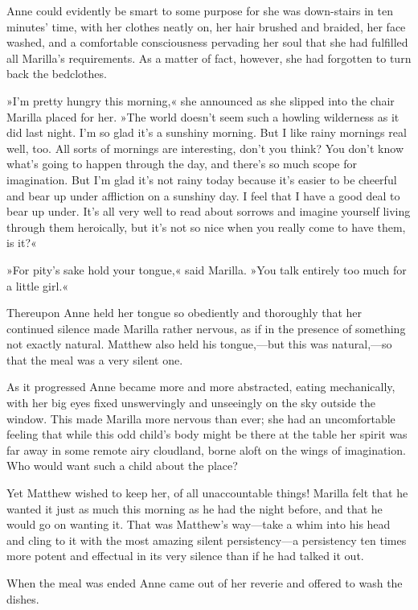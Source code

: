 Anne could evidently be smart to some purpose for she was down-stairs in ten minutes' time, with her clothes neatly on, her hair brushed and braided, her face washed, and a comfortable consciousness pervading her soul that she had fulfilled all Marilla's requirements. As a matter of fact, however, she had forgotten to turn back the bedclothes.

»I'm pretty hungry this morning,« she announced as she slipped into the chair Marilla placed for her. »The world doesn't seem such a howling wilderness as it did last night. I'm so glad it's a sunshiny morning. But I like rainy mornings real well, too. All sorts of mornings are interesting, don't you think? You don't know what's going to happen through the day, and there's so much scope for imagination. But I'm glad it's not rainy today because it's easier to be cheerful and bear up under affliction on a sunshiny day. I feel that I have a good deal to bear up under. It's all very well to read about sorrows and imagine yourself living through them heroically, but it's not so nice when you really come to have them, is it?«

»For pity's sake hold your tongue,« said Marilla. »You talk entirely too much for a little girl.«

Thereupon Anne held her tongue so obediently and thoroughly that her continued silence made Marilla rather nervous, as if in the presence of something not exactly natural. Matthew also held his tongue,—but this was natural,—so that the meal was a very silent one.

As it progressed Anne became more and more abstracted, eating mechanically, with her big eyes fixed unswervingly and unseeingly on the sky outside the window. This made Marilla more nervous than ever; she had an uncomfortable feeling that while this odd child's body might be there at the table her spirit was far away in some remote airy cloudland, borne aloft on the wings of imagination. Who would want such a child about the place?

Yet Matthew wished to keep her, of all unaccountable things! Marilla felt that he wanted it just as much this morning as he had the night before, and that he would go on wanting it. That was Matthew's way—take a whim into his head and cling to it with the most amazing silent persistency—a persistency ten times more potent and effectual in its very silence than if he had talked it out.

When the meal was ended Anne came out of her reverie and offered to wash the dishes.

